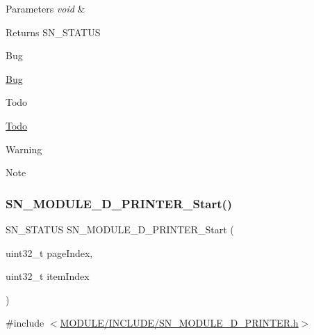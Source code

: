 \begin{DoxyParams}{Parameters}
{\em void} & \\
\hline
\end{DoxyParams}
\begin{DoxyReturn}{Returns}
S\+N\+\_\+\+S\+T\+A\+T\+US 
\end{DoxyReturn}
\begin{DoxyRefDesc}{Bug}
\item[\hyperlink{bug__bug000007}{Bug}]\end{DoxyRefDesc}
\begin{DoxyRefDesc}{Todo}
\item[\hyperlink{todo__todo000007}{Todo}]\end{DoxyRefDesc}
\begin{DoxyWarning}{Warning}

\end{DoxyWarning}
\begin{DoxyNote}{Note}

\end{DoxyNote}
\mbox{\label{group__PRINTER_ga439ebb10f8ee839218655c5177e9110b}} 
\subsubsection{\texorpdfstring{S\+N\+\_\+\+M\+O\+D\+U\+L\+E\+\_\+D\+\_\+\+P\+R\+I\+N\+T\+E\+R\+\_\+\+Start()}{SN\_MODULE\_3D\_PRINTER\_Start()}}
{\footnotesize\ttfamily S\+N\+\_\+\+S\+T\+A\+T\+US S\+N\+\_\+\+M\+O\+D\+U\+L\+E\+\_\+D\+\_\+\+P\+R\+I\+N\+T\+E\+R\+\_\+\+Start (\begin{DoxyParamCaption}\item[{uint32\+\_\+t}]{page\+Index,  }\item[{uint32\+\_\+t}]{item\+Index }\end{DoxyParamCaption})}



{\ttfamily \#include $<$\hyperlink{SN__MODULE__3D__PRINTER_8h}{M\+O\+D\+U\+L\+E/\+I\+N\+C\+L\+U\+D\+E/\+S\+N\+\_\+\+M\+O\+D\+U\+L\+E\+\_\+D\+\_\+\+P\+R\+I\+N\+T\+E\+R.\+h}$>$}


